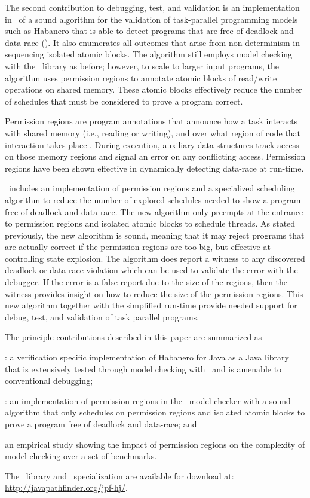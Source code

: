 The second contribution to debugging, test, and validation is an
implementation in \jpf\ of a sound algorithm for the validation of
task-parallel programming models such as Habanero that is able to
detect programs that are free of deadlock and data-race (\jpfhj). It also enumerates all outcomes that arise from non-determinism in sequencing isolated atomic blocks. The
algorithm still employs model checking with the \hjv\ library as
before; however, to scale to larger input programs, the algorithm uses
permission regions to annotate atomic blocks of read/write operations
on shared memory. These atomic blocks effectively reduce the number of
schedules that must be considered to prove a program correct.

Permission regions are program annotations that announce how a task
interacts with shared memory (i.e., reading or writing), and over what
region of code that interaction takes place
\cite{Westbrook:2011:PRR:2341616.2341627,
  Westbrook:2012:PPR:2367163.2367201}. During execution, auxiliary
data structures track access on those memory regions and signal an
error on any conflicting access. Permission regions have been shown
effective in dynamically detecting data-race at run-time.

\jpfhj\ includes an implementation of permission regions and a
specialized scheduling algorithm to reduce the number of explored
schedules needed to show a program free of deadlock and data-race. The
new algorithm only preempts at the entrance to permission regions and isolated atomic blocks to
schedule threads.  As stated previously, the new algorithm is sound,
meaning that it may reject programs that are actually correct if the
permission regions are too big, but effective at controlling state explosion. The
algorithm does report a witness to any discovered deadlock or
data-race violation which can be used to validate the error with the
debugger. If the error is a false report due to the size of the
regions, then the witness provides insight on how to reduce the size of
the permission regions. This new algorithm together with the
simplified run-time provide needed support for debug, test, and
validation of task parallel programs.

The principle contributions described in this paper are summarized as
\begin{compactitem}
\item \hjv: a verification specific implementation of Habanero for Java as a Java library that is extensively tested through model checking with \jpf\ and is amenable to conventional debugging;
\item \jpfhj: an implementation of permission regions in the \jpf\ model checker with a sound algorithm that only schedules on permission regions and isolated atomic blocks to prove a program free of deadlock and data-race; and 
\item an empirical study showing the impact of permission regions on the complexity of model checking over a set of benchmarks.
\end{compactitem}
The \hjv\ library and \jpfhj\ specialization are available for
download at: \url{http://javapathfinder.org/jpf-hj/}.
